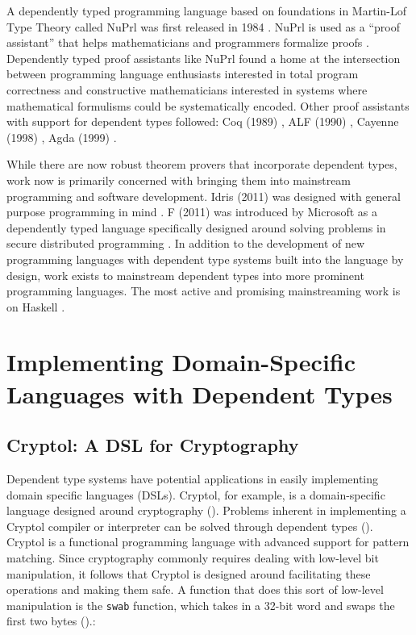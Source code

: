 A dependently typed programming language based on foundations in Martin-Lof Type
Theory called NuPrl was first released in 1984 \cite{nuprl}. NuPrl is used as a
``proof assistant'' that helps mathematicians and programmers formalize proofs
\cite{prl_home}. Dependently typed proof assistants like NuPrl found a home at
the intersection between programming language enthusiasts interested in total
program correctness and constructive mathematicians interested in systems where
mathematical formulisms could be systematically encoded. Other proof assistants
with support for dependent types followed: Coq (1989) \cite{girard1989proofs},
ALF (1990) \cite{Magnusson95theimplementation}, Cayenne (1998)
\cite{Augustsson:1998:CLD:291251.289451}, Agda (1999)
\cite{structured_type_theory}.

While there are now robust theorem provers that incorporate dependent types,
work now is primarily concerned with bringing them into mainstream programming
and software development. Idris (2011) was designed with general purpose
programming in mind \cite{tdd_book}. F\text{*} (2011) was introduced by Microsoft as a
dependently typed language specifically designed around solving problems in
secure distributed programming \cite{fstar_distributed_programming}. In addition
to the development of new programming languages with dependent type systems
built into the language by design, work exists to mainstream dependent types
into more prominent programming languages. The most active and promising
mainstreaming work is on Haskell \cite{eisenberg2016, gundry2013}. 

\section{Implementing Domain-Specific Languages with Dependent Types}

\subsection{Cryptol: A DSL for Cryptography}

Dependent type systems have potential applications in easily implementing domain
specific languages (DSLs). Cryptol, for example, is a domain-specific language
designed around cryptography (\cite{cryptol_manual}). Problems inherent in
implementing a Cryptol compiler or interpreter can be solved through dependent
types (\cite{power_of_pi}). Cryptol is a functional programming language with
advanced support for pattern matching. Since cryptography commonly requires
dealing with low-level bit manipulation, it follows that Cryptol is designed
around facilitating these operations and making them safe. A function that does
this sort of low-level manipulation is the \texttt{swab} function, which takes
in a 32-bit word and swaps the first two bytes (\cite{cryptol_manual}).: 

